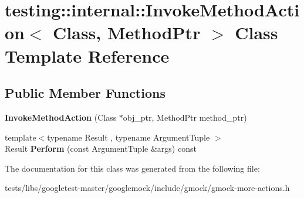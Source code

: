\hypertarget{classtesting_1_1internal_1_1InvokeMethodAction}{}\section{testing\+:\+:internal\+:\+:Invoke\+Method\+Action$<$ Class, Method\+Ptr $>$ Class Template Reference}
\label{classtesting_1_1internal_1_1InvokeMethodAction}
\subsection*{Public Member Functions}
\begin{DoxyCompactItemize}
\item 
\mbox{\label{classtesting_1_1internal_1_1InvokeMethodAction_a16e545f6166e2d54eeafdc2ab3adf06b}} 
{\bfseries Invoke\+Method\+Action} (Class $\ast$obj\+\_\+ptr, Method\+Ptr method\+\_\+ptr)
\item 
\mbox{\label{classtesting_1_1internal_1_1InvokeMethodAction_aed6971c668bc2c7671d512306b25b1ab}} 
{\footnotesize template$<$typename Result , typename Argument\+Tuple $>$ }\\Result {\bfseries Perform} (const Argument\+Tuple \&args) const
\end{DoxyCompactItemize}


The documentation for this class was generated from the following file\+:\begin{DoxyCompactItemize}
\item 
tests/libs/googletest-\/master/googlemock/include/gmock/gmock-\/more-\/actions.\+h\end{DoxyCompactItemize}
